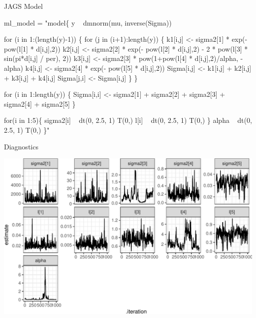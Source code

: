 \documentclass[11pt,ignorenonframetext,]{beamer}
\newenvironment{Shaded}{}{}
\newcommand{\NormalTok}[1]{#1}
\newcommand{\StringTok}[1]{\textcolor[rgb]{0.25,0.44,0.63}{#1}}
\let\oldShaded\Shaded
\let\endoldShaded\endShaded
\renewenvironment{Shaded}{\footnotesize\begin{spacing}{0.9}\oldShaded}{\endoldShaded\end{spacing}}
\let\oldverbatim\verbatim
\let\endoldverbatim\endverbatim
\newcommand{\scriptoutput}{
  \renewenvironment{Shaded}{\scriptsize\begin{spacing}{0.9}\oldShaded}{\endoldShaded\end{spacing}}
  \renewenvironment{verbatim}{\scriptsize\begin{spacing}{0.9}\oldverbatim}{\endoldverbatim\end{spacing}}
}
\begin{document}
\begin{frame}[fragile]{%
\protect\hypertarget{jags-model}{%
JAGS Model}}

\scriptoutput

\begin{Shaded}
\begin{Highlighting}[]
\NormalTok{ml_model =}\StringTok{ "model\{}
\StringTok{  y ~ dmnorm(mu, inverse(Sigma))}

\StringTok{  for (i in 1:(length(y)-1)) \{}
\StringTok{    for (j in (i+1):length(y)) \{}
\StringTok{      k1[i,j] <- sigma2[1] * exp(- pow(l[1] * d[i,j],2))}
\StringTok{      k2[i,j] <- sigma2[2] * exp(- pow(l[2] * d[i,j],2) - 2 * pow(l[3] * sin(pi*d[i,j] / per), 2))}
\StringTok{      k3[i,j] <- sigma2[3] * pow(1+pow(l[4] * d[i,j],2)/alpha, -alpha)}
\StringTok{      k4[i,j] <- sigma2[4] * exp(- pow(l[5] * d[i,j],2))}
\StringTok{      }
\StringTok{      Sigma[i,j] <- k1[i,j] + k2[i,j] + k3[i,j] + k4[i,j]}
\StringTok{      Sigma[j,i] <- Sigma[i,j]}
\StringTok{    \}}
\StringTok{  \}}

\StringTok{  for (i in 1:length(y)) \{}
\StringTok{    Sigma[i,i] <- sigma2[1] + sigma2[2] + sigma2[3] + sigma2[4] + sigma2[5]}
\StringTok{  \}  }

\StringTok{  for(i in 1:5)\{}
\StringTok{    sigma2[i] ~ dt(0, 2.5, 1) T(0,)}
\StringTok{    l[i] ~ dt(0, 2.5, 1) T(0,)}
\StringTok{  \}}
\StringTok{  alpha ~ dt(0, 2.5, 1) T(0,)}
\StringTok{\}"}
\end{Highlighting}
\end{Shaded}

\end{frame}

\begin{frame}{%
\protect\hypertarget{diagnostics}{%
Diagnostics}}

\begin{center}\includegraphics[width=\textwidth]{Lec14_files/figure-beamer/unnamed-chunk-17-1} \end{center}

\end{frame}
\end{document}
